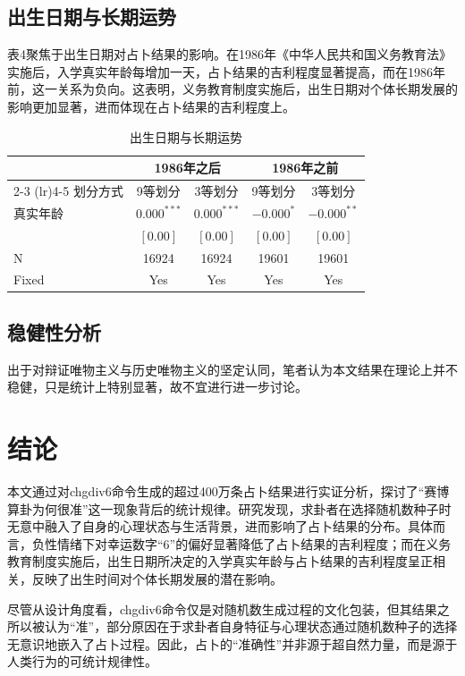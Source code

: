 \documentclass[11pt, a4paper, UTF8]{chinese-erj}
\begin{document}
\subsection{出生日期与长期运势}

表4聚焦于出生日期对占卜结果的影响。在1986年《中华人民共和国义务教育法》实施后，入学真实年龄每增加一天，占卜结果的吉利程度显著提高，而在1986年前，这一关系为负向。这表明，义务教育制度实施后，出生日期对个体长期发展的影响更加显著，进而体现在占卜结果的吉利程度上。

\begin{table}[H]
\centering
\caption{出生日期与长期运势}
\begin{tabular}{lcccc}
\toprule
 & \multicolumn{2}{c}{1986年之后} & \multicolumn{2}{c}{1986年之前} \\
\cmidrule(lr){2-3} \cmidrule(lr){4-5}
划分方式 & 9等划分 & 3等划分 & 9等划分 & 3等划分 \\
\midrule
真实年龄 & $0.000^{***}$ & $0.000^{***}$ & $-0.000^{*}$ & $-0.000^{**}$ \\
         & $[0.00]$      & $[0.00]$      & $[0.00]$     & $[0.00]$ \\
N        & 16924         & 16924         & 19601        & 19601 \\
Fixed    & Yes           & Yes           & Yes          & Yes \\
\bottomrule
\end{tabular}
\end{table}

\subsection{稳健性分析}

出于对辩证唯物主义与历史唯物主义的坚定认同，笔者认为本文结果在理论上并不稳健，只是统计上特别显著，故不宜进行进一步讨论。

\section{结论}

本文通过对chgdiv6命令生成的超过400万条占卜结果进行实证分析，探讨了“赛博算卦为何很准”这一现象背后的统计规律。研究发现，求卦者在选择随机数种子时无意中融入了自身的心理状态与生活背景，进而影响了占卜结果的分布。具体而言，负性情绪下对幸运数字“6”的偏好显著降低了占卜结果的吉利程度；而在义务教育制度实施后，出生日期所决定的入学真实年龄与占卜结果的吉利程度呈正相关，反映了出生时间对个体长期发展的潜在影响。

尽管从设计角度看，chgdiv6命令仅是对随机数生成过程的文化包装，但其结果之所以被认为“准”，部分原因在于求卦者自身特征与心理状态通过随机数种子的选择无意识地嵌入了占卜过程。因此，占卜的“准确性”并非源于超自然力量，而是源于人类行为的可统计规律性。

\erjref
\printbibliography[heading=none]
\end{document}

